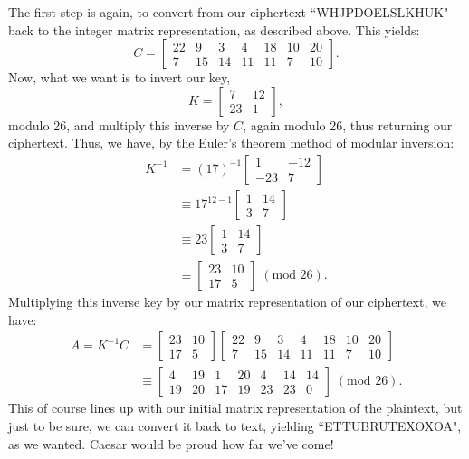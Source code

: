 \documentclass{article}
\begin{document}
\noindent The first step is again, to convert from our ciphertext ``WHJPDOELSLKHUK" back to the integer matrix representation, as described above. This yields:
\[
    C = \begin{bmatrix}
        22 & 9 & 3 & 4 & 18 & 10 & 20 \\
        7 & 15 & 14 & 11 & 11 & 7 & 10
    \end{bmatrix}.
\]
Now, what we want is to invert our key,
\[
    K = \begin{bmatrix}
        7 & 12 \\
        23 & 1
    \end{bmatrix},
\]
modulo 26, and multiply this inverse by $C$, again modulo 26, thus returning our ciphertext. Thus, we have, by the Euler's theorem method of modular inversion:
\begin{align*}
    K^{-1} &= (17)^{-1} \begin{bmatrix}
        1 & -12 \\
        -23 & 7
    \end{bmatrix} \\
    &\equiv 17^{12 - 1} \begin{bmatrix}
        1 & 14 \\
        3 & 7
    \end{bmatrix} \\
    &\equiv 23 \begin{bmatrix}
        1 & 14 \\
        3 & 7
    \end{bmatrix} \\
    &\equiv \begin{bmatrix}
        23 & 10 \\
        17 & 5
    \end{bmatrix} \; (\text{mod } 26).
\end{align*}
Multiplying this inverse key by our matrix representation of our ciphertext, we have:
\begin{align*}
    A = K^{-1} C &= \begin{bmatrix}
        23 & 10 \\
        17 & 5
    \end{bmatrix} \begin{bmatrix}
        22 & 9 & 3 & 4 & 18 & 10 & 20 \\
        7 & 15 & 14 & 11 & 11 & 7 & 10
    \end{bmatrix} \\
    &\equiv \begin{bmatrix}
        4 & 19 & 1 & 20 & 4 & 14 & 14 \\
        19 & 20 & 17 & 19 & 23 & 23 & 0
    \end{bmatrix} \; (\text{mod } 26).
\end{align*}
This of course lines up with our initial matrix representation of the plaintext, but just to be sure, we can convert it back to text, yielding ``ETTUBRUTEXOXOA", as we wanted. Caesar would be proud how far we've come!
\end{document}
